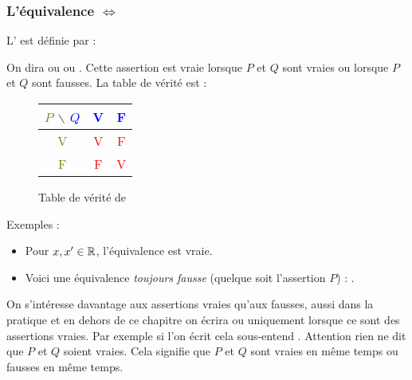 \documentclass[11pt,class=report,crop=false]{standalone}
\begin{document}
\subsubsection*{L'équivalence $\iff$}


L' est définie par :

On dira  ou 
ou . Cette assertion est vraie
lorsque $P$ et $Q$ sont vraies ou lorsque $P$ et $Q$ sont fausses.
La table de vérité est :
\begin{figure}[H]
\centering
\begin{tabular}{c|c|c}
\textcolor{olive}{$P$} $\backslash$ \textcolor{blue}{$Q$}  & \textcolor{blue}{V} & \textcolor{blue}{F} \\ \hline
\textcolor{olive}{V} & \textcolor{red}{V} & \textcolor{red}{F} \\ \hline
\textcolor{olive}{F} & \textcolor{red}{F} & \textcolor{red}{V} \\
\end{tabular}
\caption{Table de vérité de }
\end{figure}

Exemples :
\begin{itemize}
  \item Pour $x,x' \in \mathbb{R}$, l'équivalence  est vraie.
  \item Voici une équivalence \emph{toujours fausse} (quelque soit l'assertion $P$) :
.
\end{itemize}

On s'intéresse davantage aux assertions vraies qu'aux fausses, aussi dans la pratique
et en dehors de ce chapitre on écrira   ou 
uniquement lorsque ce sont des assertions vraies. Par exemple si l'on écrit
  cela sous-entend .
Attention rien ne dit que $P$ et $Q$ soient vraies. Cela signifie que $P$ et $Q$ sont vraies en même
temps ou fausses en même temps.
\end{document}
